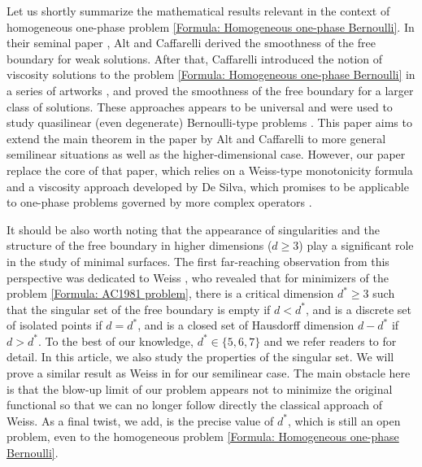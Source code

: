 \documentclass[11pt,reqno]{amsart}
\begin{document}
Let us shortly summarize the mathematical results relevant in the context of homogeneous one-phase problem \eqref{Formula: Homogeneous one-phase Bernoulli}. In their seminal paper \cite{AC1981}, Alt and Caffarelli derived the smoothness of the free boundary for weak solutions. After that, Caffarelli introduced the notion of viscosity solutions to the problem \eqref{Formula: Homogeneous one-phase Bernoulli} in a series of artworks \cite{C1987,C1989,C1988}, and proved the smoothness of the free boundary for a larger class of solutions. These approaches appears to be universal and were used to study quasilinear (even degenerate) Bernoulli-type problems \cite{ACF1984,DP2005}. This paper aims to extend the main theorem in the paper by Alt and Caffarelli to more general semilinear situations as well as the higher-dimensional case. However, our paper replace the core of that paper, which relies on a Weiss-type monotonicity formula and a viscosity approach developed by De Silva, which promises to be applicable to one-phase problems governed by more complex operators \cite{DY2023}.

It should be also worth noting that the appearance of singularities and the structure of the free boundary in higher dimensions ($d\geqslant3$) play a significant role in the study of minimal surfaces. The first far-reaching observation from this perspective was dedicated to Weiss \cite{W1999}, who revealed that for minimizers of the problem \eqref{Formula: AC1981 problem}, there is a critical dimension $d^{*}\geqslant3$ such that the singular set of the free boundary is empty if $d<d^{*}$, and is a discrete set of isolated points if $d=d^{*}$, and is a closed set of Hausdorff dimension $d-d^{*}$ if $d>d^{*}$. To the best of our knowledge, $d^{*}\in\{5,6,7\}$ and we refer readers to \cite{CJK2004,SJ2009,JS2015} for detail. In this article, we also study the properties of the singular set. We will prove a similar result as Weiss in \cite{W1999} for our semilinear case. The main obstacle here is that the blow-up limit of our problem appears not to minimize the original functional so that we can no longer follow directly the classical approach of Weiss. As a final twist, we add, is the precise value of $d^{*}$, which is still an open problem, even to the homogeneous problem \eqref{Formula: Homogeneous one-phase Bernoulli}.
\end{document}
